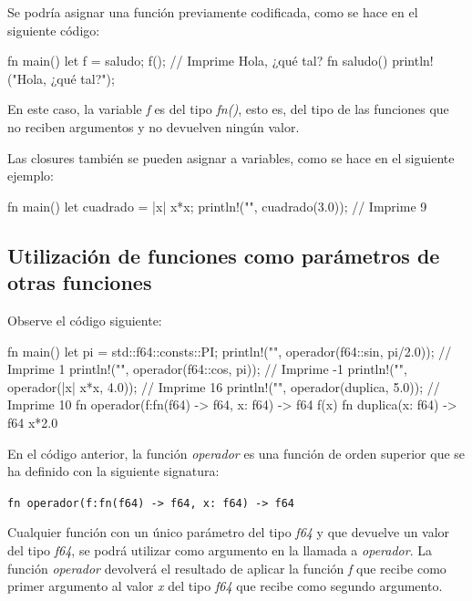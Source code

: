 Se podría asignar una función previamente codificada, como se hace en el siguiente código:

\vspace{0.7em}
\begin{Codigo}
fn main() {
   let f = saludo;
   f(); // Imprime Hola, ¿qué tal?
}
fn saludo() {
   println!("Hola, ¿qué tal?");
}
\end{Codigo}

En este caso, la variable \textit{f} es del tipo \textit{fn()}, esto es, del tipo de las funciones que no reciben argumentos y no devuelven ningún valor.

Las closures también se pueden asignar a variables, como se hace en el siguiente ejemplo:

\vspace{0.7em}
\begin{Codigo}
fn main() {
   let cuadrado = |x| {x*x};
   println!("{}", cuadrado(3.0)); // Imprime 9
}
\end{Codigo}

\subsection{Utilización de funciones como parámetros de otras funciones}
Observe el código siguiente:

\vspace{0.7em}
\begin{Codigo}
fn main() {
   let pi = std::f64::consts::PI;
   println!("{}", operador(f64::sin, pi/2.0)); // Imprime 1
   println!("{}", operador(f64::cos, pi)); // Imprime -1
   println!("{}", operador(|x| x*x, 4.0)); // Imprime 16
   println!("{}", operador(duplica, 5.0)); // Imprime 10
}
fn operador(f:fn(f64) -> f64, x: f64) -> f64 {
   f(x)
}
fn duplica(x: f64) -> f64 {
   x*2.0
}
\end{Codigo}

En el código anterior, la función \textit{operador} es una función de orden superior que se ha definido con la siguiente signatura:

{\centering \texttt{fn operador(f:fn(f64) -> f64, x: f64) -> f64} \par}

Cualquier función con un único parámetro del tipo \textit{f64} y que devuelve un valor del tipo \textit{f64}, se podrá utilizar como argumento en la llamada a \textit{operador}. La función \textit{operador} devolverá el resultado de aplicar la función \textit{f} que recibe como primer argumento al valor \textit{x} del tipo \textit{f64} que recibe como segundo argumento.


